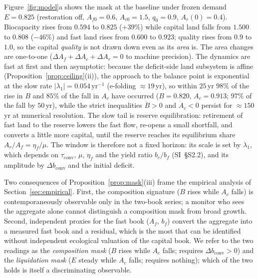 \documentclass[preprint,12pt,authoryear]{elsarticle}
\newcommand{\dconv}{\Delta b_{\mathrm{conv}}}
\newcommand{\tconv}{\tau_{\mathrm{conv}}}
\begin{document}
Figure~\ref{fig:model}a shows the mask at the baseline under frozen demand $E=0.825$ (restoration off, $A_{f0}=0.6$, $A_{c0}=1.5$, $q_0=0.9$, $A_r(0)=0.4$). Biocapacity rises from $0.594$ to $0.825$ ($+39\%$) while capital land falls from $1.500$ to $0.808$ ($-46\%$) and fast land rises from $0.600$ to $0.923$; quality rises from $0.9$ to $1.0$, so the capital \emph{quality} is not drawn down even as its \emph{area} is. The area changes are one-to-one ($\Delta A_f+\Delta A_c+\Delta A_r=0$ to machine precision). The dynamics are fast at first and then asymptotic: because the deficit-side land subsystem is affine (Proposition~\ref{prop:ceiling}(ii)), the approach to the balance point is exponential at the slow rate $|\lambda_1|=0.054\,\mathrm{yr}^{-1}$ (e-folding $\approx19$\,yr), so within $25$\,yr $98\%$ of the rise in $B$ and $85\%$ of the fall in $A_c$ have occurred ($B=0.820$, $A_c=0.913$; $97\%$ of the fall by $50$\,yr), while the strict inequalities $\dot B>0$ and $\dot A_c<0$ persist for $\approx150$\,yr at numerical resolution. The slow tail is reserve equilibration: retirement of fast land to the reserve lowers the fast flow, re-opens a small shortfall, and converts a little more capital, until the reserve reaches its equilibrium share $A_r/A_f=\eta_f/\mu$. The window is therefore not a fixed horizon: its scale is set by $\lambda_1$, which depends on $\tconv$, $\mu$, $\eta_f$ and the yield ratio $b_c/b_f$ (SI~\S S2.2), and its amplitude by $\dconv$ and the initial deficit.

Two consequences of Proposition~\ref{prop:mask}(iii) frame the empirical analysis of Section~\ref{sec:empirical}. First, the composition signature ($B$ rises while $A_c$ falls) is contemporaneously observable only in the two-book series; a monitor who sees the aggregate alone cannot distinguish a composition mask from broad growth. Second, independent proxies for the fast book ($A_f$, $b_f$) convert the aggregate into a measured fast book and a residual, which is the most that can be identified without independent ecological valuation of the capital book. We refer to the two readings as the \emph{composition mask} ($B$ rises while $A_c$ falls; requires $\dconv>0$) and the \emph{liquidation mask} ($E$ steady while $A_c$ falls; requires nothing); which of the two holds is itself a discriminating observable.
\end{document}
